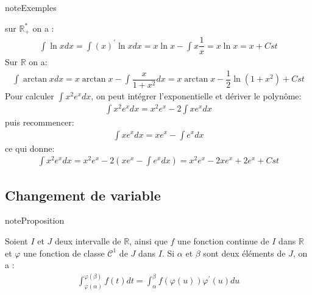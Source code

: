 \documentclass[letterpaper,10pt,french]{jupyterBook}
\begin{document}
\begin{sphinxadmonition}{note}{Exemples}

\sphinxhyphen{} sur \(\mathbb R_+^*\) on a :
\begin{equation*}
\begin{split}
\int \ln x dx = \int (x)^{'}\ln x dx = x\ln x - \int x\dfrac{1}{x} = x\ln x = x + Cst 
\end{split}
\end{equation*}
\sphinxhyphen{} Sur \(\mathbb R\) on a:
\begin{equation*}
\begin{split}
\int \arctan x dx = x \arctan x - \int \dfrac{x}{1+x^2} dx = x \arctan x - \dfrac{1}{2}\ln (1+x^2) + Cst
\end{split}
\end{equation*}
 \sphinxhyphen{} Pour calculer \(\int x^2 e^x dx\), on peut intégrer l’exponentielle et dériver le polynôme:
\begin{equation*}
\begin{split}
\int x^2 e^x dx = x^2e^x - 2\int xe^x dx
\end{split}
\end{equation*}
\sphinxAtStartPar
puis recommencer:
\begin{equation*}
\begin{split}
\int xe^x dx = xe^x - \int e^x dx
\end{split}
\end{equation*}
\sphinxAtStartPar
ce qui donne:
\begin{equation*}
\begin{split}
\int x^2 e^x dx = x^2e^x - 2(xe^x - \int e^x dx) = x^2e^x - 2xe^x + 2e^x + Cst
\end{split}
\end{equation*}\end{sphinxadmonition}


\subsection{Changement de variable}
\label{\detokenize{methodcalp:changement-de-variable}}
\begin{sphinxadmonition}{note}{Proposition}

\sphinxAtStartPar
Soient \(I\) et \(J\) deux intervalle de \(\mathbb R\), ainsi que \(f\) une fonction continue de \(I\) dans \(\mathbb R\) et \(\varphi\) une fonction de classe \(\mathcal C^1\) de \(J\) dans \(I\). Si \(\alpha\) et \(\beta\) sont deux éléments de \(J\), on a :
\begin{equation*}
\begin{split}
\int_{\varphi(\alpha)}^{\varphi(\beta)} f(t)dt = \int_\alpha^\beta f(\varphi(u)) \varphi^{'}(u)du
\end{split}
\end{equation*}\end{sphinxadmonition}
\end{document}
